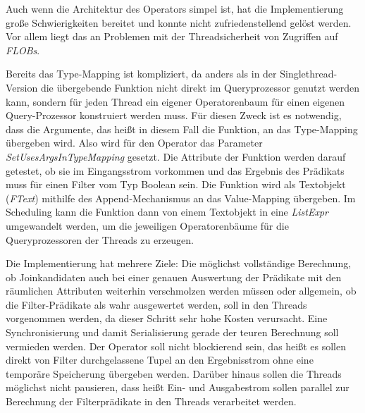 \documentclass[a4paper,12pt,twoside]{article}
\newcommand{\Fb}[1]{\textit{#1}} %
\begin{document}
Auch wenn die Architektur des Operators simpel ist, hat die Implementierung große Schwierigkeiten bereitet und konnte nicht zufriedenstellend gelöst werden. Vor allem liegt das an Problemen mit der Threadsicherheit von Zugriffen auf \Fb{FLOBs}.

Bereits das Type-Mapping ist kompliziert, da anders als in der Singlethread-Version die übergebende Funktion nicht direkt im Queryprozessor genutzt werden kann, sondern für jeden Thread ein eigener Operatorenbaum für einen eigenen Query-Prozessor konstruiert werden muss. Für diesen Zweck ist es notwendig, dass die Argumente, das heißt in diesem Fall die Funktion, an das Type-Mapping übergeben wird. Also wird für den Operator das Parameter \Fb{SetUsesArgsInTypeMapping} gesetzt. Die Attribute der Funktion werden darauf getestet, ob sie im Eingangsstrom vorkommen und das Ergebnis des Prädikats muss für einen Filter vom Typ Boolean sein. Die Funktion wird als Textobjekt (\Fb{FText}) mithilfe des Append-Mechanismus an das Value-Mapping übergeben. Im Scheduling kann die Funktion dann von einem Textobjekt in eine \Fb{ListExpr} umgewandelt werden, um die jeweiligen Operatorenbäume für die Queryprozessoren der Threads zu erzeugen.

Die Implementierung hat mehrere Ziele: Die möglichst vollständige Berechnung, ob Joinkandidaten auch bei einer genauen Auswertung der Prädikate mit den räumlichen Attributen weiterhin verschmolzen werden müssen oder allgemein, ob die Filter-Prädikate als wahr ausgewertet werden, soll in den Threads vorgenommen werden, da dieser Schritt sehr hohe Kosten verursacht. Eine Synchronisierung und damit Serialisierung gerade der teuren Berechnung soll vermieden werden. Der Operator soll nicht blockierend sein, das heißt es sollen direkt von Filter durchgelassene Tupel an den Ergebnisstrom ohne eine temporäre Speicherung übergeben werden. Darüber hinaus sollen die Threads möglichst nicht pausieren, dass heißt Ein- und Ausgabestrom sollen parallel zur Berechnung der Filterprädikate in den Threads verarbeitet werden.
\end{document}
